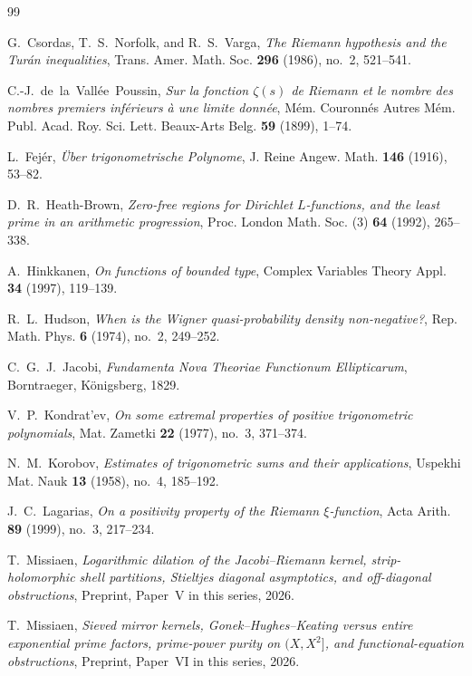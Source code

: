 \documentclass[11pt,reqno]{amsart}
\theoremstyle{definition}
\theoremstyle{remark}
\numberwithin{equation}{section}
\begin{document}
\begin{thebibliography}{99}

G.~Csordas, T.~S.~Norfolk, and R.~S.~Varga,
\emph{The Riemann hypothesis and the Tur\'an inequalities},
Trans. Amer. Math. Soc. \textbf{296} (1986), no.~2, 521--541.

C.-J.~de~la~Vall\'ee~Poussin,
\emph{Sur la fonction $\zeta(s)$ de Riemann et le nombre des nombres premiers inf\'erieurs \`a une limite donn\'ee},
M\'em. Couronn\'es Autres M\'em. Publ. Acad. Roy. Sci. Lett. Beaux-Arts Belg. \textbf{59} (1899), 1--74.

L.~Fej\'er,
\emph{\"Uber trigonometrische Polynome},
J. Reine Angew. Math. \textbf{146} (1916), 53--82.

D.~R.~Heath-Brown,
\emph{Zero-free regions for Dirichlet $L$-functions, and the least prime in an arithmetic progression},
Proc. London Math. Soc. (3) \textbf{64} (1992), 265--338.

A.~Hinkkanen,
\emph{On functions of bounded type},
Complex Variables Theory Appl. \textbf{34} (1997), 119--139.

R.~L.~Hudson,
\emph{When is the Wigner quasi-probability density non-negative?},
Rep. Math. Phys. \textbf{6} (1974), no.~2, 249--252.

C.~G.~J.~Jacobi,
\emph{Fundamenta Nova Theoriae Functionum Ellipticarum},
Borntraeger, K\"onigsberg, 1829.

V.~P.~Kondrat'ev,
\emph{On some extremal properties of positive trigonometric polynomials},
Mat. Zametki \textbf{22} (1977), no.~3, 371--374.

N.~M.~Korobov,
\emph{Estimates of trigonometric sums and their applications},
Uspekhi Mat. Nauk \textbf{13} (1958), no.~4, 185--192.

J.~C.~Lagarias,
\emph{On a positivity property of the Riemann $\xi$-function},
Acta Arith. \textbf{89} (1999), no.~3, 217--234.

T.~Missiaen,
\emph{Logarithmic dilation of the Jacobi--Riemann kernel, strip-holomorphic shell partitions, Stieltjes diagonal asymptotics, and off-diagonal obstructions},
Preprint, Paper~V in this series, 2026.

T.~Missiaen,
\emph{Sieved mirror kernels, Gonek--Hughes--Keating versus entire exponential prime factors, prime-power purity on $(X, X^2]$, and functional-equation obstructions},
Preprint, Paper~VI in this series, 2026.


\end{thebibliography}
\end{document}

